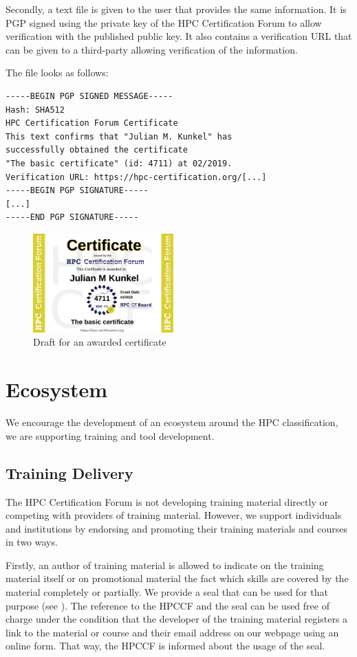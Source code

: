 \documentclass[jocse]{jocseart}
\begin{document}
Secondly, a text file is given to the user that provides the same information.
It is PGP signed using the private key of the HPC Certification Forum to allow verification with the published public key.
It also contains a verification URL that can be given to a third-party allowing verification of the information.

The file looks as follows:
\begin{verbatim}
-----BEGIN PGP SIGNED MESSAGE-----
Hash: SHA512
HPC Certification Forum Certificate
This text confirms that "Julian M. Kunkel" has
successfully obtained the certificate
"The basic certificate" (id: 4711) at 02/2019.
Verification URL: https://hpc-certification.org/[...]
-----BEGIN PGP SIGNATURE-----
[...]
-----END PGP SIGNATURE-----
\end{verbatim}

\begin{figure}
  \includegraphics[width=0.48\textwidth]{JulianMKunkel}
  \caption{Draft for an awarded certificate}
  \label{fig:awardedCertificate}
\end{figure}


\section{Ecosystem}
\label{sec:ecosystem}

We encourage the development of an ecosystem around the HPC classification, we are supporting training and tool development.

\subsection{Training Delivery}

The HPC Certification Forum is not developing training material directly or competing with providers of training material.
However, we support individuals and institutions by endorsing and promoting their training materials and courses in two ways.

Firstly, an author of training material is allowed to indicate on the training material itself or on promotional material the fact
which skills are covered by the material completely or partially.
We provide a seal that can be used for that purpose (see ).
The reference to the HPCCF and the seal can be used free of charge under the condition that the developer of the training material
registers a link to the material or course and their email address on our webpage using an online form.
That way, the HPCCF is informed about the usage of the seal.
\end{document}
